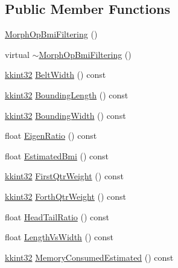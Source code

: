 \subsection*{Public Member Functions}
\begin{DoxyCompactItemize}
\item 
\hyperlink{class_k_k_b_1_1_morph_op_bmi_filtering_a995e0f72536514aa63db49cb03e957a8}{Morph\+Op\+Bmi\+Filtering} ()
\item 
virtual \hyperlink{class_k_k_b_1_1_morph_op_bmi_filtering_afe08c76f90090e8af6eea183d5c2157a}{$\sim$\+Morph\+Op\+Bmi\+Filtering} ()
\item 
\hyperlink{namespace_k_k_b_a8fa4952cc84fda1de4bec1fbdd8d5b1b}{kkint32} \hyperlink{class_k_k_b_1_1_morph_op_bmi_filtering_aa92bec6553f0dde2837109957a549bab}{Belt\+Width} () const 
\item 
\hyperlink{namespace_k_k_b_a8fa4952cc84fda1de4bec1fbdd8d5b1b}{kkint32} \hyperlink{class_k_k_b_1_1_morph_op_bmi_filtering_a6836353e921b33168c405d07ec2444dc}{Bounding\+Length} () const 
\item 
\hyperlink{namespace_k_k_b_a8fa4952cc84fda1de4bec1fbdd8d5b1b}{kkint32} \hyperlink{class_k_k_b_1_1_morph_op_bmi_filtering_a33e12d7d95723981ec88ab0b7ca8d1a1}{Bounding\+Width} () const 
\item 
float \hyperlink{class_k_k_b_1_1_morph_op_bmi_filtering_a7fdc40401291d53339572575c3f4e4b1}{Eigen\+Ratio} () const 
\item 
float \hyperlink{class_k_k_b_1_1_morph_op_bmi_filtering_a55438ab1119053099111acca0f509260}{Estimated\+Bmi} () const 
\item 
\hyperlink{namespace_k_k_b_a8fa4952cc84fda1de4bec1fbdd8d5b1b}{kkint32} \hyperlink{class_k_k_b_1_1_morph_op_bmi_filtering_ae8e583cedaf6e14a968ecd9594832e8a}{First\+Qtr\+Weight} () const 
\item 
\hyperlink{namespace_k_k_b_a8fa4952cc84fda1de4bec1fbdd8d5b1b}{kkint32} \hyperlink{class_k_k_b_1_1_morph_op_bmi_filtering_a5de96b9d14c71ecc56f471cbf725307b}{Forth\+Qtr\+Weight} () const 
\item 
float \hyperlink{class_k_k_b_1_1_morph_op_bmi_filtering_a441fd4be638e90e60eadf0c1ac4ff15a}{Head\+Tail\+Ratio} () const 
\item 
float \hyperlink{class_k_k_b_1_1_morph_op_bmi_filtering_a5508fb0e4d4c382c671f3fb235fe47e1}{Length\+Vs\+Width} () const 
\item 
\hyperlink{namespace_k_k_b_a8fa4952cc84fda1de4bec1fbdd8d5b1b}{kkint32} \hyperlink{class_k_k_b_1_1_morph_op_bmi_filtering_a3a8705b9e84f424270a3a329f167d173}{Memory\+Consumed\+Estimated} () const 

\end{DoxyCompactItemize}
